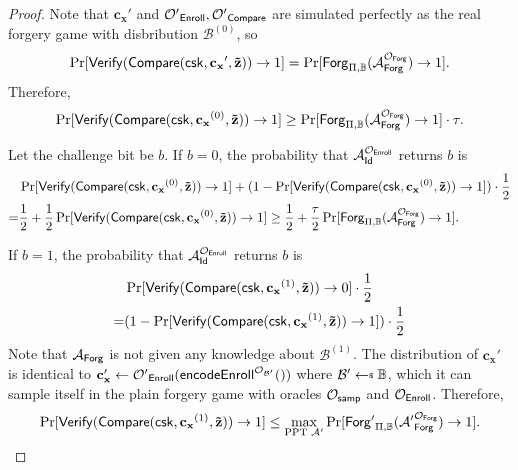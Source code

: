 \begin{proof}
Note that $\mathbf{c_x}'$ and $\mathcal{O'}_{\sf Enroll}, \mathcal{O'}_{\sf Compare}$ are simulated perfectly as the real forgery game with disbribution $\mathcal{B}^{(0)}$, so
\[
	\Pr[{\sf Verify}( {\sf Compare}({\sf csk}, \mathbf{c_x}', \mathbf{\tilde{z}}) ) \to 1] = \Pr[{\sf Forg}_{\Pi, \mathbb{B}}(\mathcal{A}_{\sf Forg}^{\mathcal{O}_{\sf Forg} }) \to 1 ].
\]
Therefore,
\[
	\Pr[{\sf Verify}( {\sf Compare}({\sf csk}, \mathbf{c_x}^{(0)}, \mathbf{\tilde{z}}) ) \to 1] \geq \Pr[{\sf Forg}_{\Pi, \mathbb{B}}(\mathcal{A}_{\sf Forg}^{\mathcal{O}_{\sf Forg}}) \to 1 ] \cdot \tau.
\]

Let the challenge bit be $b$. If $b = 0$, the probability that $\mathcal{A}_{\sf Id}^{\mathcal{O}_{\sf Enroll}}$ returns $b$ is
	\[
	\begin{aligned}
		&\Pr[{\sf Verify}({\sf Compare}({\sf csk}, \mathbf{c_x}^{(0)}, \mathbf{\tilde{z}})) \to 1 ] + (1 - \Pr[{\sf Verify}({\sf Compare}({\sf csk}, \mathbf{c_x}^{(0)}, \mathbf{\tilde{z}})) \to 1 ]) \cdot \frac{1}{2} \\
		= & \frac{1}{2} + \frac{1}{2}\Pr[{\sf Verify}({\sf Compare}({\sf csk}, \mathbf{c_x}^{(0)}, \mathbf{\tilde{z}})) \to 1 ] \geq \frac{1}{2} + \frac{\tau}{2} \Pr[{\sf Forg}_{\Pi, \mathbb{B}}(\mathcal{A}_{\sf Forg}^{\mathcal{O}_{\sf Forg} }) \to 1 ].
	\end{aligned}
	\]

If $b = 1$, the probability that $\mathcal{A}_{\sf Id}^{\mathcal{O}_{\sf Enroll}}$ returns $b$ is
	\[
	\begin{aligned}
		&\Pr[{\sf Verify}({\sf Compare}({\sf csk}, \mathbf{c_x}^{(1)}, \mathbf{\tilde{z}})) \to 0 ] \cdot \frac{1}{2} \\
		= & (1 - \Pr[{\sf Verify}({\sf Compare}({\sf csk}, \mathbf{c_x}^{(1)}, \mathbf{\tilde{z}})) \to 1 ] ) \cdot \frac{1}{2} \\
		\end{aligned}
	\]
	Note that $\mathcal{A}_{\sf Forg}$ is not given any knowledge about $\mathcal{B}^{(1)}$. The distribution of $\mathbf{c_x'}$ is identical to $\mathbf{c_x'} \gets \mathcal{O'}_{\sf Enroll}( {\sf encodeEnroll}^{\mathcal{O}_{\mathcal{B'}}}() ) $ where $\mathcal{B}' \getsdollar \mathbb{B} $, which it can sample itself in the plain forgery game with oracles $\mathcal{O}_{\sf samp}$ and $\mathcal{O}_{\sf Enroll}$. Therefore,
	\[
		\Pr[{\sf Verify}({\sf Compare}({\sf csk}, \mathbf{c_x}^{(1)}, \mathbf{\tilde{z}})) \to 1 ] \leq \max_{\text{PPT }\mathcal{A'}} \Pr[ {\sf Forg'}_{\Pi, \mathbb{B}}(\mathcal{A'}_{\sf Forg}^{\mathcal{O}_{\sf Forg}}) \to 1 ].
	\]


\end{proof}
